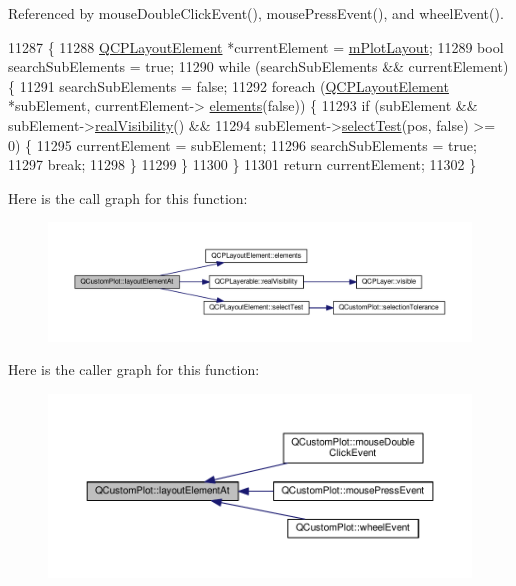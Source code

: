 Referenced by mouse\+Double\+Click\+Event(), mouse\+Press\+Event(), and wheel\+Event().


\begin{DoxyCode}
11287                                                                        \{
11288   \hyperlink{class_q_c_p_layout_element}{QCPLayoutElement} *currentElement = \hyperlink{class_q_custom_plot_ac97298756882a0eecd98151679850ac1}{mPlotLayout};
11289   \textcolor{keywordtype}{bool} searchSubElements = \textcolor{keyword}{true};
11290   \textcolor{keywordflow}{while} (searchSubElements && currentElement) \{
11291     searchSubElements = \textcolor{keyword}{false};
11292     \textcolor{keywordflow}{foreach} (\hyperlink{class_q_c_p_layout_element}{QCPLayoutElement} *subElement, currentElement->
      \hyperlink{class_q_c_p_layout_element_a311d60d78e62ef8eaaedb1b6ceb9e788}{elements}(\textcolor{keyword}{false})) \{
11293       \textcolor{keywordflow}{if} (subElement && subElement->\hyperlink{class_q_c_p_layerable_a30809f7455e9794bca7b6c737622fa63}{realVisibility}() &&
11294           subElement->\hyperlink{class_q_c_p_layout_element_a9fcf5d0ea19f2c23b2b528bce2c6f095}{selectTest}(pos, \textcolor{keyword}{false}) >= 0) \{
11295         currentElement = subElement;
11296         searchSubElements = \textcolor{keyword}{true};
11297         \textcolor{keywordflow}{break};
11298       \}
11299     \}
11300   \}
11301   \textcolor{keywordflow}{return} currentElement;
11302 \}
\end{DoxyCode}


Here is the call graph for this function\+:\nopagebreak
\begin{figure}[H]
\begin{center}
\leavevmode
\includegraphics[width=350pt]{class_q_custom_plot_a840458186d4483c8a42d6a399448d38f_cgraph}
\end{center}
\end{figure}




Here is the caller graph for this function\+:\nopagebreak
\begin{figure}[H]
\begin{center}
\leavevmode
\includegraphics[width=350pt]{class_q_custom_plot_a840458186d4483c8a42d6a399448d38f_icgraph}
\end{center}
\end{figure}


